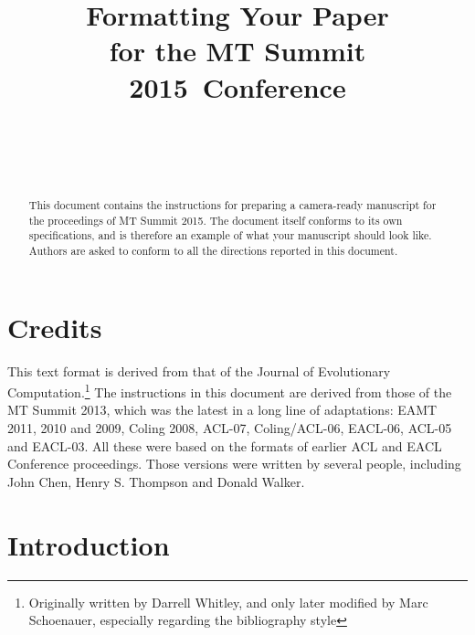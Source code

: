 \documentclass[]{article}
\newcommand{\confname}{MT Summit 2015}
\begin{document}
\title{\bf Formatting Your Paper \\
  for the \confname~Conference}  

\author{ \hfill  {}\\ 
         \hfill {}\\ 
\AND
        \hfill {}\\
}

\maketitle
\pagestyle{empty}

\begin{abstract}
  This document contains the instructions for preparing a camera-ready
  manuscript for the proceedings of \confname . The document itself
  conforms to its own specifications, and is therefore an example of
  what your manuscript should look like. Authors are asked to conform
  to all the directions reported in this document.
\end{abstract}

\section{Credits}

This text format is derived from that of the Journal of Evolutionary
Computation.\footnote{Originally written by Darrell Whitley, and only
  later modified by Marc Schoenauer, especially regarding the
  bibliography style} The instructions in this document are derived
from those of the MT Summit 2013, %
which was the latest in a long line of adaptations: EAMT 2011, 2010
and 2009, Coling 2008, ACL-07, Coling/ACL-06, EACL-06, ACL-05 and
EACL-03.  All these were based on the formats of earlier ACL and EACL
Conference proceedings.  Those versions were written by several
people, including John Chen, Henry S. Thompson and Donald Walker.

\section{Introduction}
\end{document}
